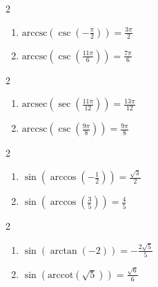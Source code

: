 \documentclass{ximera}
\begin{document}
\begin{multicols}{2}

\begin{enumerate}

\setcounter{enumi}{\value{HW}}

\item  $\text{arccsc}\left(\csc\left(-\frac{\pi}{2} \right) \right) = \frac{3\pi}{2}$ 
\item  $\text{arccsc}\left(\csc\left(\frac{11\pi}{6}\right) \right) = \frac{7\pi}{6}$

\setcounter{HW}{\value{enumi}}

\end{enumerate}

\end{multicols}

\begin{multicols}{2}

\begin{enumerate}

\setcounter{enumi}{\value{HW}}

\item  $\text{arcsec}\left(\sec\left(\frac{11\pi}{12}\right) \right) = \frac{13\pi}{12}$
\item  $\text{arccsc}\left(\csc\left(\frac{9\pi}{8}\right) \right) = \frac{9\pi}{8}$ 

\setcounter{HW}{\value{enumi}}

\end{enumerate}

\end{multicols}


\begin{multicols}{2}

\begin{enumerate}

\setcounter{enumi}{\value{HW}}

\item  $\sin\left(\arccos\left(-\frac{1}{2}\right)\right) = \frac{\sqrt{3}}{2}$
\item  $\sin\left(\arccos\left(\frac{3}{5}\right)\right) = \frac{4}{5}$

\setcounter{HW}{\value{enumi}}

\end{enumerate}

\end{multicols}

\begin{multicols}{2}

\begin{enumerate}

\setcounter{enumi}{\value{HW}}

\item  $\sin\left(\arctan\left(-2\right)\right) = -\frac{2\sqrt{5}}{5}$
\item  $\sin\left(\text{arccot}\left(\sqrt{5}\right)\right) = \frac{\sqrt{6}}{6}$

\setcounter{HW}{\value{enumi}}

\end{enumerate}

\end{multicols}
\end{document}
